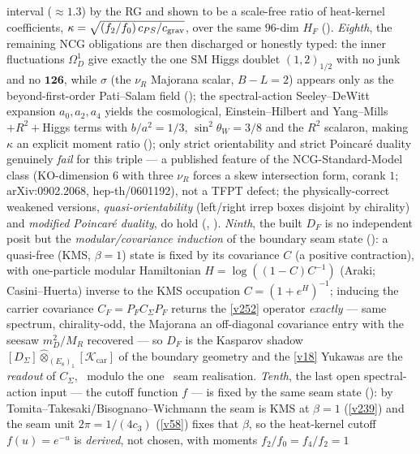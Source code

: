 interval ($\approx1.3$) by the RG and shown to be a scale-free ratio of heat-kernel coefficients,
$\kappa=\sqrt{(f_2/f_0)\,c_{PS}/c_{\rm grav}}$, over the same $96$-dim $H_F$ ().
\emph{Eighth}, the remaining NCG obligations are then discharged or honestly typed: the inner fluctuations
$\Omega^1_D$ give exactly the one SM Higgs doublet $(1,2)_{1/2}$ with no junk and no $\mathbf{126}$, while
$\sigma$ (the $\nu_R$ Majorana scalar, $B{-}L{=}2$) appears only as the beyond-first-order Pati--Salam field
(); the spectral-action Seeley--DeWitt expansion $a_0,a_2,a_4$ yields the
cosmological, Einstein--Hilbert and Yang--Mills$+R^2+$Higgs terms with $b/a^2=1/3$, $\sin^2\theta_W=3/8$ and
the $R^2$ scalaron, making $\kappa$ an explicit moment ratio ();
only strict orientability and strict Poincar\'e duality genuinely \emph{fail} for this triple --- a
published feature of the NCG-Standard-Model class (KO-dimension $6$ with three $\nu_R$ forces a skew
intersection form, corank $1$; arXiv:0902.2068, hep-th/0601192), not a TFPT defect; the
physically-correct weakened versions, \emph{quasi-orientability} (left/right irrep boxes disjoint by
chirality) and \emph{modified Poincar\'e duality}, do hold (,
).
\emph{Ninth}, the built $D_F$ is no independent posit but the \emph{modular/covariance induction} of the
boundary seam state (): a quasi-free (KMS, $\beta{=}1$) state is
fixed by its covariance $C$ (a positive contraction), with one-particle modular Hamiltonian
$H=\log((1{-}C)C^{-1})$ (Araki; Casini--Huerta) inverse to the KMS occupation $C=(1{+}e^{H})^{-1}$; inducing
the carrier covariance $C_F=P_F C_\Sigma P_F$ returns the \vref{v252} operator \emph{exactly} --- same
spectrum, chirality-odd, the Majorana an off-diagonal covariance entry with the seesaw $m_D^2/M_R$ recovered
--- so $D_F$ is the Kasparov shadow $[D_\Sigma]\widehat\otimes_{(E_8)_1}[\mathcal K_{\mathrm{car}}]$ of the
boundary geometry and the \vref{v18} Yukawas are the \emph{readout} of $C_\Sigma$, \mE\ modulo the one \mO\
seam realisation.
\emph{Tenth}, the last open spectral-action input --- the cutoff function $f$ --- is fixed by the same seam
state (\veri{v259\_modular\_cutoff\_kappa.py}): by Tomita--Takesaki/Bisognano--Wichmann the seam is KMS at
$\beta{=}1$ (\vref{v239}) and the seam unit $2\pi{=}1/(4c_3)$ (\vref{v58}) fixes that $\beta$, so the
heat-kernel cutoff $f(u)=e^{-u}$ is \emph{derived}, not chosen, with moments $f_2/f_0=f_4/f_2=1$
